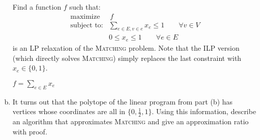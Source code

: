 \documentclass[11pt]{article}
\begin{document}
\begin{enumerate}[(a)]
    Find a function $f$ such that:
    \begin{align*}
        \text{maximize } &\, f \\
        \text{subject to:}& \sum_{e\in E, v\in e} x_e \le 1 \qquad \forall v \in V\\
                          & 0 \leq x_e \leq 1 \qquad \forall e \in E
    \end{align*}
    is an LP relaxation of the \textsc{Matching} problem. Note that the ILP version (which directly solves \textsc{Matching}) simply replaces the last constraint with $x_e\in\{0,1\}$.\\
    \begin{solution}
        $f = \sum_{e \in E} x_e$
    \end{solution}
    \item It turns out that the polytope of the linear program from part (b) has vertices whose coordinates are all in $\{0,\frac{1}{2}, 1\}$. Using this information, describe an algorithm that approximates \textsc{Matching} and give an approximation ratio with proof.


\end{enumerate}
\end{document}
